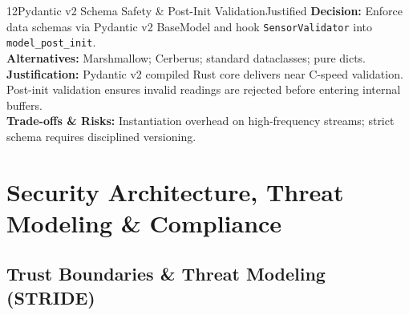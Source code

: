 \documentclass[10pt,a4paper]{report}
\begin{document}
\begin{adrbox}{12}{Pydantic v2 Schema Safety \& Post-Init Validation}{Justified}
\textbf{Decision:} Enforce data schemas via Pydantic v2 BaseModel and hook \texttt{SensorValidator} into \lstinline{model_post_init}.\\
\textbf{Alternatives:} Marshmallow; Cerberus; standard dataclasses; pure dicts.\\
\textbf{Justification:} Pydantic v2 compiled Rust core delivers near C-speed validation. Post-init validation ensures invalid readings are rejected before entering internal buffers.\\
\textbf{Trade-offs \& Risks:} Instantiation overhead on high-frequency streams; strict schema requires disciplined versioning.
\end{adrbox}

\chapter{Security Architecture, Threat Modeling \& Compliance}

\section{Trust Boundaries \& Threat Modeling (STRIDE)}
\end{document}
